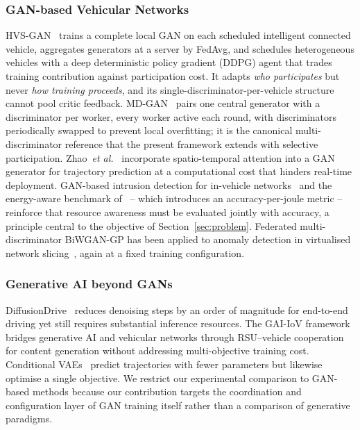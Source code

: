 \documentclass[journal]{IEEEtran}
\begin{document}
\subsubsection{GAN-based Vehicular Networks}
HVS-GAN~\cite{wu2024hvsgan} trains a complete local GAN on each scheduled
intelligent connected vehicle, aggregates generators at a server by FedAvg, and
schedules heterogeneous vehicles with a deep deterministic policy gradient
(DDPG) agent that trades training contribution against participation cost. It
adapts \emph{who participates} but never \emph{how training proceeds}, and its
single-discriminator-per-vehicle structure cannot pool critic feedback.
MD-GAN~\cite{hardy2019mdgan} pairs one central generator with a discriminator
per worker, every worker active each round, with discriminators periodically
swapped to prevent local overfitting; it is the canonical multi-discriminator
reference that the present framework extends with selective participation.
Zhao~\emph{et al.}~\cite{zhao2020trajectory} incorporate spatio-temporal
attention into a GAN generator for trajectory prediction at a computational
cost that hinders real-time deployment. GAN-based intrusion detection for
in-vehicle networks~\cite{seo2018gids} and the energy-aware benchmark
of~\cite{ioannou2026ganenergy} -- which introduces an accuracy-per-joule metric
-- reinforce that resource awareness must be evaluated jointly with accuracy, a
principle central to the objective of Section~\ref{sec:problem}. Federated
multi-discriminator BiWGAN-GP has been applied to anomaly detection in
virtualised network slicing~\cite{wang2022mdbiwgan}, again at a fixed training
configuration.

\subsubsection{Generative AI beyond GANs}
DiffusionDrive~\cite{liao2025diffusiondrive} reduces denoising steps by an
order of magnitude for end-to-end driving yet still requires substantial
inference resources. The GAI-IoV framework~\cite{xie2024gaiiov} bridges
generative AI and vehicular networks through RSU--vehicle cooperation for
content generation without addressing multi-objective training cost.
Conditional VAEs~\cite{demiguel2022vae} predict trajectories with fewer
parameters but likewise optimise a single objective. We restrict our
experimental comparison to GAN-based methods because our contribution targets
the coordination and configuration layer of GAN training itself rather than a
comparison of generative paradigms.
\end{document}
